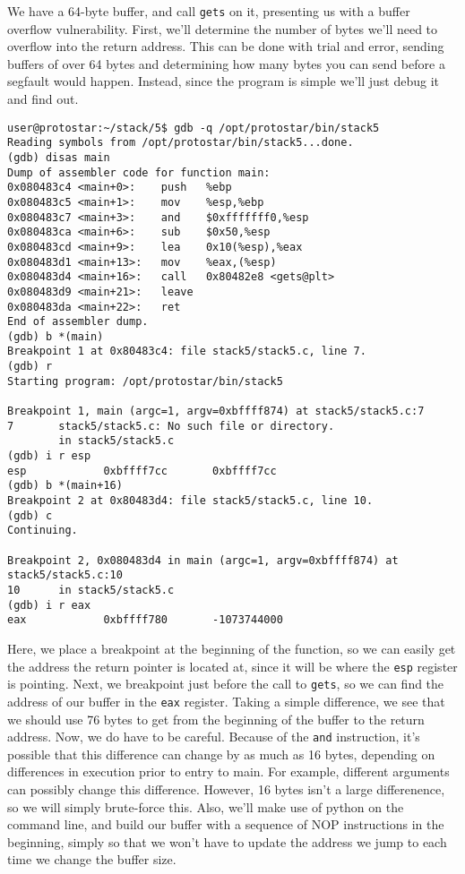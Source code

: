 

We have a 64-byte buffer, and call \texttt{gets} on it, presenting
us with a buffer overflow vulnerability. First, we'll determine
the number of bytes we'll need to overflow into the return address.
This can be done with trial and error, sending buffers of over 64 bytes
and determining how many bytes you can send before a segfault would happen.
Instead, since the program is simple we'll just debug it and find out.

\begin{lstlisting}
user@protostar:~/stack/5$ gdb -q /opt/protostar/bin/stack5
Reading symbols from /opt/protostar/bin/stack5...done.
(gdb) disas main
Dump of assembler code for function main:
0x080483c4 <main+0>:    push   %ebp
0x080483c5 <main+1>:    mov    %esp,%ebp
0x080483c7 <main+3>:    and    $0xfffffff0,%esp
0x080483ca <main+6>:    sub    $0x50,%esp
0x080483cd <main+9>:    lea    0x10(%esp),%eax
0x080483d1 <main+13>:   mov    %eax,(%esp)
0x080483d4 <main+16>:   call   0x80482e8 <gets@plt>
0x080483d9 <main+21>:   leave  
0x080483da <main+22>:   ret    
End of assembler dump.
(gdb) b *(main)
Breakpoint 1 at 0x80483c4: file stack5/stack5.c, line 7.
(gdb) r
Starting program: /opt/protostar/bin/stack5 

Breakpoint 1, main (argc=1, argv=0xbffff874) at stack5/stack5.c:7
7       stack5/stack5.c: No such file or directory.
        in stack5/stack5.c
(gdb) i r esp
esp            0xbffff7cc       0xbffff7cc
(gdb) b *(main+16)
Breakpoint 2 at 0x80483d4: file stack5/stack5.c, line 10.
(gdb) c
Continuing.

Breakpoint 2, 0x080483d4 in main (argc=1, argv=0xbffff874) at stack5/stack5.c:10
10      in stack5/stack5.c
(gdb) i r eax
eax            0xbffff780       -1073744000
\end{lstlisting}

Here, we place a breakpoint at the beginning of the function,
so we can easily get the address the return pointer is located 
at, since it will be where the \texttt{esp} register is pointing.
Next, we breakpoint just before the call to \texttt{gets}, so 
we can find the address of our buffer in the \texttt{eax} register.
Taking a simple difference, we see that we should use 76 bytes to get
from the beginning of the buffer to the return address. Now, we
do have to be careful. Because of the \texttt{and} instruction,
it's possible that this difference can change by as much as 16 bytes, 
depending on differences in execution prior to entry to main. For example,
different arguments can possibly change this difference. However,
16 bytes isn't a large differenence, so we will simply brute-force this.
Also, we'll make use of python on the command line, and build our
buffer with a sequence of NOP instructions in the beginning, simply
so that we won't have to update the address we jump to each time
we change the buffer size.


